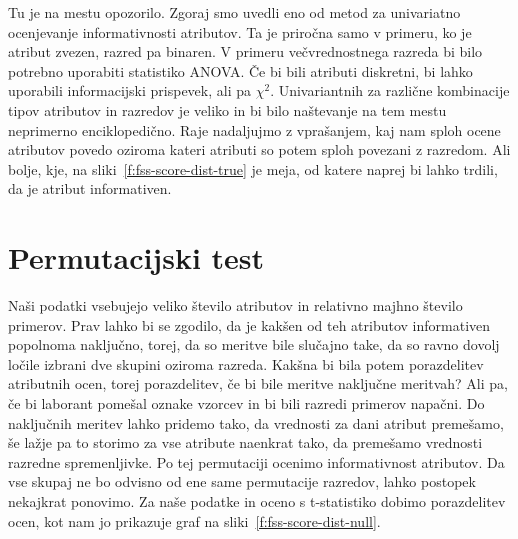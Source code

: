 \begin{figure}[htbp]
\end{figure}

Tu je na mestu opozorilo. Zgoraj smo uvedli eno od metod za univariatno ocenjevanje informativnosti atributov. Ta je priročna samo v primeru, ko je atribut zvezen, razred pa binaren. V primeru večvrednostnega razreda bi bilo potrebno uporabiti statistiko ANOVA. Če bi bili atributi diskretni, bi lahko uporabili informacijski prispevek, ali pa $\chi^2$. Univariantnih za različne kombinacije tipov atributov in razredov je veliko in bi bilo naštevanje na tem mestu neprimerno enciklopedično. Raje nadaljujmo z vprašanjem, kaj nam sploh ocene atributov povedo oziroma kateri atributi so potem sploh povezani z razredom. Ali bolje, kje, na sliki~\ref{f:fss-score-dist-true} je meja, od katere naprej bi lahko trdili, da je atribut informativen.

\section{Permutacijski test}

Naši podatki vsebujejo veliko število atributov in relativno majhno število primerov. Prav lahko bi se zgodilo, da je kakšen od teh atributov informativen popolnoma naključno, torej, da so meritve bile slučajno take, da so ravno dovolj ločile izbrani dve skupini oziroma razreda. Kakšna bi bila potem porazdelitev atributnih ocen, torej porazdelitev, če bi bile meritve naključne meritvah? Ali pa, če bi laborant pomešal oznake vzorcev in bi bili razredi primerov napačni. Do naključnih meritev lahko pridemo tako, da vrednosti za dani atribut premešamo, še lažje pa to storimo za vse atribute naenkrat tako, da premešamo vrednosti razredne spremenljivke. Po tej permutaciji ocenimo informativnost atributov. Da vse skupaj ne bo odvisno od ene same permutacije razredov, lahko postopek nekajkrat ponovimo. Za naše podatke in oceno s t-statistiko dobimo porazdelitev ocen, kot nam jo prikazuje graf na sliki~\ref{f:fss-score-dist-null}.

